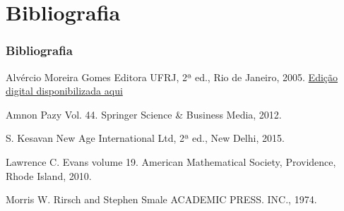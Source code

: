 \section{Bibliografia}

\begin{frame}\frametitle{Bibliografia}

\begin{thebibliography}{}
\beamertemplatebookbibitems
{}
Alvércio Moreira Gomes
\newblock Editora UFRJ, 2ª ed., Rio de Janeiro, 2005.
\newblock \href{https://www.im.ufrj.br/index.php/pt/estrutura/editora-im/matematica/1931-semigrupos-de-operadores-lineares-e-aplicacoes-as-equacoes-de-evolucao}{Edição digital disponibilizada aqui}

Amnon Pazy
\newblock  Vol. 44. Springer Science \& Business Media, 2012.


S. Kesavan
\newblock New Age International Ltd, 2ª ed., New Delhi, 2015.

\end{thebibliography}

\end{frame}

\begin{frame}

\begin{thebibliography}{}
\beamertemplatebookbibitems

Lawrence C. Evans
\newblock volume 19. American Mathematical Society, Providence, Rhode Island, 2010.

Morris W. Rirsch  and Stephen Smale
\newblock ACADEMIC PRESS. INC., 1974.

\end{thebibliography}

\end{frame}


